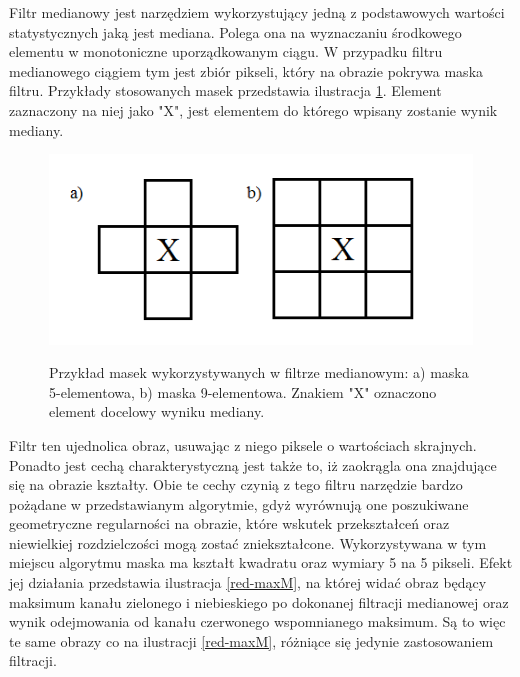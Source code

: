 Filtr medianowy jest narzędziem wykorzystujący jedną z podstawowych wartości statystycznych jaką jest mediana. Polega ona na wyznaczaniu środkowego elementu w monotoniczne uporządkowanym ciągu\cite{Malina}. W przypadku filtru medianowego ciągiem tym jest zbiór pikseli, który na obrazie pokrywa maska filtru. Przykłady stosowanych masek przedstawia ilustracja \ref{maski}. Element zaznaczony na niej jako "X", jest elementem do którego wpisany zostanie wynik mediany.\newpage
\begin{figure}[H]
\begin{center}
\includegraphics[scale=0.8]{imgs/maski.png}
\caption[Przykład masek filtru medianowego.]\small{Przykład masek wykorzystywanych w filtrze medianowym: a) maska 5-elementowa, b) maska 9-elementowa. Znakiem "X" oznaczono element docelowy wyniku mediany.}
\label{maski}
\end{center}
\end{figure}
Filtr ten ujednolica obraz, usuwając z niego piksele o wartościach skrajnych. Ponadto jest cechą charakterystyczną jest także to, iż zaokrągla ona znajdujące się na obrazie kształty. Obie te cechy czynią z tego filtru narzędzie bardzo pożądane w przedstawianym algorytmie, gdyż wyrównują one poszukiwane geometryczne regularności na obrazie, które wskutek przekształceń oraz niewielkiej rozdzielczości mogą zostać zniekształcone. Wykorzystywana w tym miejscu algorytmu maska ma kształt kwadratu oraz wymiary 5 na 5 pikseli. Efekt jej działania przedstawia ilustracja \ref{red-maxM}, na której widać obraz będący maksimum kanału zielonego i niebieskiego po dokonanej filtracji medianowej oraz wynik odejmowania od kanału czerwonego wspomnianego maksimum. Są to więc te same obrazy co na ilustracji \ref{red-maxM}, różniące się jedynie zastosowaniem filtracji.
